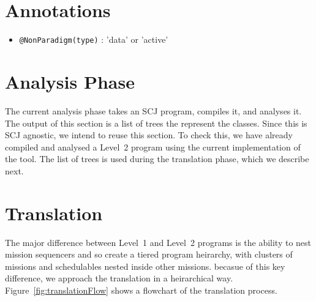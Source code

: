 \documentclass[10pt,a4paper]{article}
\begin{document}
\section{Annotations}

\begin{itemize}
\item \texttt{@NonParadigm(type)} : 'data' or 'active'

\end{itemize}

\section{Analysis Phase}

The current analysis phase takes an SCJ program, compiles it, and analyses it. The output of this section is a list of trees the represent the classes. Since this is SCJ agnostic, we intend to reuse this section. To check this, we have already compiled and analysed a Level~2 program using the current implementation of the tool. The list of trees is used during the translation phase, which we describe next.

\section{Translation}

The major difference between Level~1 and Level~2 programs is the ability to nest mission sequencers and so create a tiered program heirarchy, with clusters of missions and schedulables nested inside other missions. becasue of this key difference, we approach the translation in a heirarchical way. Figure~\ref{fig:translationFlow} shows a flowchart of the translation process. 
\end{document}
